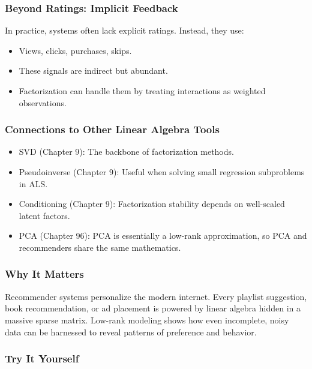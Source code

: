 \documentclass[
  letterpaper,
  DIV=11,
  numbers=noendperiod]{scrreprt}
\providecommand{\tightlist}{%
  \setlength{\itemsep}{0pt}\setlength{\parskip}{0pt}}
\begin{document}
\subsubsection{Beyond Ratings: Implicit
Feedback}\label{beyond-ratings-implicit-feedback}

In practice, systems often lack explicit ratings. Instead, they use:

\begin{itemize}
\tightlist
\item
  Views, clicks, purchases, skips.
\item
  These signals are indirect but abundant.
\item
  Factorization can handle them by treating interactions as weighted
  observations.
\end{itemize}

\subsubsection{Connections to Other Linear Algebra
Tools}\label{connections-to-other-linear-algebra-tools}

\begin{itemize}
\tightlist
\item
  SVD (Chapter 9): The backbone of factorization methods.
\item
  Pseudoinverse (Chapter 9): Useful when solving small regression
  subproblems in ALS.
\item
  Conditioning (Chapter 9): Factorization stability depends on
  well-scaled latent factors.
\item
  PCA (Chapter 96): PCA is essentially a low-rank approximation, so PCA
  and recommenders share the same mathematics.
\end{itemize}

\subsubsection{Why It Matters}\label{why-it-matters-92}

Recommender systems personalize the modern internet. Every playlist
suggestion, book recommendation, or ad placement is powered by linear
algebra hidden in a massive sparse matrix. Low-rank modeling shows how
even incomplete, noisy data can be harnessed to reveal patterns of
preference and behavior.

\subsubsection{Try It Yourself}\label{try-it-yourself-96}
\end{document}
